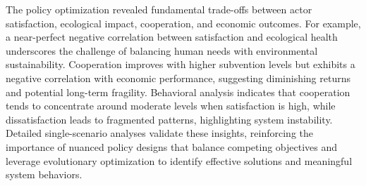 \documentclass[ruler]{CUP-JNL-EDS}%
\begin{document}
The policy optimization revealed fundamental trade-offs between actor satisfaction, ecological 
impact, cooperation, and economic outcomes. For example, a near-perfect negative correlation 
between satisfaction and ecological health underscores the challenge of balancing human needs 
with environmental sustainability. Cooperation improves with higher subvention levels but exhibits 
a negative correlation with economic performance, suggesting diminishing returns and potential 
long-term fragility. Behavioral analysis indicates that cooperation tends to concentrate around 
moderate levels when satisfaction is high, while dissatisfaction leads to fragmented patterns, 
highlighting system instability. Detailed single-scenario analyses validate these insights, 
reinforcing the importance of nuanced policy designs that balance competing objectives and 
leverage evolutionary optimization to identify effective solutions and meaningful system behaviors.
\end{document}
